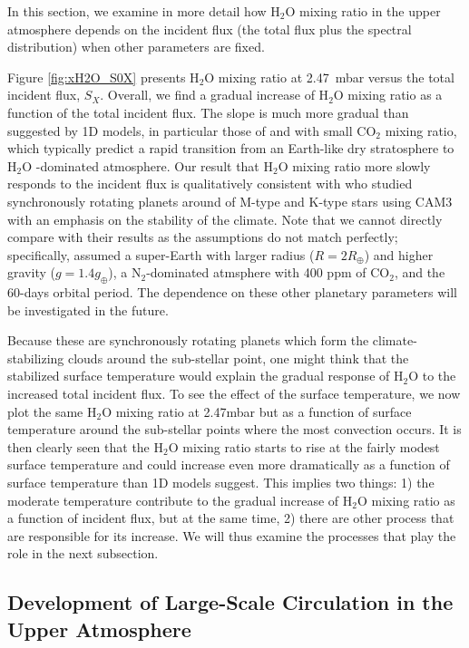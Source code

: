 \documentclass[11pt,numberedappendix,twocolappendix,]{emulateapj}
\def\water{H$_2$O }
\def\preslevel{2.47}
\begin{document}
In this section, we examine in more detail how \water mixing ratio in the upper atmosphere depends on the incident flux (the total flux plus the spectral distribution) when other parameters are fixed. 

Figure \ref{fig:xH2O_S0X} presents \water mixing ratio at \preslevel ~mbar versus the total incident flux, $S_X$. 
Overall, we find a gradual increase of \water mixing ratio as a function of the total incident flux. 
The slope is much more gradual than suggested by 1D models, in particular those  of \citet{Kasting1993} and \citet{Wordsworth2013} with small CO$_2$ mixing ratio, which typically predict a rapid transition from an Earth-like dry stratosphere to  \water-dominated atmosphere. 
Our result that \water mixing ratio more slowly responds to the incident flux is qualitatively consistent with \citet{Yang2013} who studied synchronously rotating planets around of M-type and K-type stars using CAM3 with an emphasis on the stability of the climate. 
Note that we cannot directly compare with their results as the assumptions do not match perfectly; specifically, \cite{Yang2013} assumed a super-Earth with larger radius ($R=2R_{\oplus}$) and higher gravity ($g=1.4g_{\oplus}$), a N$_2$-dominated atmsphere with 400 ppm of CO$_2$, and the 60-days orbital period. 
The dependence on these other planetary parameters will be investigated in the future. 

Because these are synchronously rotating planets which form the climate-stabilizing clouds around the sub-stellar point, one might think that the stabilized surface temperature would explain the gradual response of \water to the increased total incident flux. 
To see the effect of the surface temperature, we now plot the same \water mixing ratio at \preslevel mbar but as a function of surface temperature around the sub-stellar points where the most convection occurs. 
It is then clearly seen that the \water mixing ratio starts to rise at the fairly modest surface temperature and could increase even more dramatically as a function of surface temperature than 1D models suggest. 
This implies two things: 1) the moderate temperature contribute to the gradual increase of \water mixing ratio as a function of incident flux, but at the same time, 2) there are other process that are responsible for its increase. 
We will thus examine the processes that play the role in the next subsection. 

\subsection{Development of Large-Scale Circulation in the Upper Atmosphere}
\label{ss:result_omega}
\end{document}
